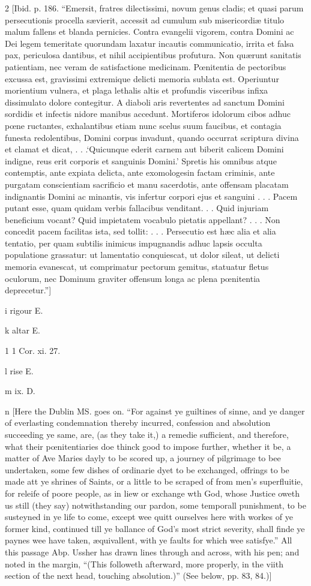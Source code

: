 2
[Ibid. p. 186. “Emersit, fratres dilectissimi, novum genus cladis; et quasi parum persecutionis procella sævierit, accessit ad cumulum sub misericordiæ titulo malum fallens et blanda pernicies. Contra evangelii vigorem, contra Domini ac Dei legem temeritate quorundam laxatur incautis communicatio, irrita et falsa pax, periculosa dantibus, et nihil accipientibus profutura. Non quærunt sanitatis patientiam, nec veram de satisfactione medicinam. Pœnitentia de pectoribus excussa est, gravissimi extremique delicti memoria sublata est. Operiuntur morientium vulnera, et plaga lethalis altis et profundis visceribus infixa dissimulato dolore contegitur. A diaboli aris revertentes ad sanctum Domini sordidis et infectis nidore manibus accedunt. Mortiferos idolorum cibos adhuc pœne ructantes, exhalantibus etiam nunc scelus suum faucibus, et contagia funesta redolentibus, Domini corpus invadunt, quando occurrat scriptura divina et clamat et dicat, . . .‘Quicunque ederit carnem aut biberit calicem Domini indigne, reus erit corporis et sanguinis Domini.’ Spretis his omnibus atque contemptis, ante expiata delicta, ante exomologesin factam criminis, ante purgatam conscientiam sacrificio et manu sacerdotis, ante offensam placatam indignantis Domini ac minantis, vis infertur corpori ejus et sanguini . . . Pacem putant esse, quam quidam verbis fallacibus venditant. . . Quid injuriam beneficium vocant? Quid impietatem vocabulo pietatis appellant? . . . Non concedit pacem facilitas ista, sed tollit: . . . Persecutio est hæc alia et alia tentatio, per quam subtilis inimicus impugnandis adhuc lapsis occulta populatione grassatur: ut lamentatio conquiescat, ut dolor sileat, ut delicti memoria evanescat, ut comprimatur pectorum gemitus, statuatur fletus oculorum, nec Dominum graviter offensum longa ac plena pœnitentia deprecetur.”]

i
rigour E.

k
altar E.

1
1 Cor. xi. 27.

l
rise E.

m
ix. D.

n
[Here the Dublin MS. goes on. “For against ye guiltines of sinne, and ye danger of everlasting condemnation thereby incurred, confession and absolution succeeding ye same, are, (as they take it,) a remedie sufficient, and therefore, what their pœnitentiaries doe thinck good to impose further, whether it be, a matter of Ave Maries dayly to be scored up, a journey of pilgrimage to bee undertaken, some few dishes of ordinarie dyet to be exchanged, offrings to be made att ye shrines of Saints, or a little to be scraped of from men’s superfluitie, for releife of poore people, as in liew or exchange wth God, whose Justice oweth us still (they say) notwithstanding our pardon, some temporall punishment, to be susteyned in ye life to come, except wee quitt ourselves here with workes of ye former kind, continued till ye ballance of God’s most strict severity, shall finde ye paynes wee have taken, æquivallent, with ye faults for which wee satisfye.” All this passage Abp. Ussher has drawn lines through and across, with his pen; and noted in the margin, “(This followeth afterward, more properly, in the viith section of the next head, touching absolution.)” (See below, pp. 83, 84.)]

